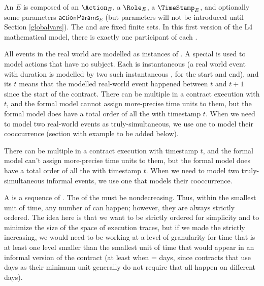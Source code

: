 \documentclass[12pt]{article}
\begin{document}
An  $E$ is composed of an  
\newcommand{\eaction}[1]{\Action_{#1}}
$\eaction{E}$, 
a  
\newcommand{\erole}[1]{\Role_{#1}}
$\erole{E}$, 
a \TimeStamp 
\newcommand{\etimestamp}[1]{\TimeStamp_{#1}}
$\etimestamp{E}$, 
and optionally some parameters 
\newcommand{\eactionparams}[1]{\textsf{actionParams}_{#1}} 
$\eactionparams{E}$ (but parameters will not be introduced until Section \ref{globalvars}). 
The \Actions and \Roles are fixed finite sets. In this first version of the L4 mathematical model, there is exactly one participant of each \Role.

All events in the real world are modelled as instances of \Actions. A special \Role {} is used to model actions that have no subject. Each \Event is instantaneous (a real world event with duration is modelled by two such instantaneous \Events, for the start and end), and its \TimeStamp $t$ means that the modelled real-world event happened between $t$ and $t+1$ \TimeUnits since the start of the contract. There can be multiple \Events in a contract execution with \TimeStamp $t$, and the formal model cannot assign more-precise time units to them, but the formal model does have a total order of all the \Events with timestamp $t$. When we need to model two real-world events as truly-simultaneous, we use one \Event to model their cooccurrence (section with example to be added below). 

There can be multiple \Events in a contract execution with timestamp $t$, and the formal model can't assign more-precise time units to them, but the formal model does have a total order of all the \Events with timestamp $t$. When we need to model two truly-simultaneous informal events, we use one \Event that models their cooccurrence.

A  is a sequence of \Events. The \TimeStamps of the \Events must be nondecreasing. Thus, within the smallest unit of time, any number of \Events can happen; however, they are always strictly ordered. The idea here is that we want \Events to be strictly ordered for simplicity and to minimize the size of the space of execution traces, but if we made the \TimeStamps strictly increasing, we would need to be working at a level of granularity for time that is at least one level smaller than the smallest unit of time that would appear in an informal version of the contract (at least when \TimeUnit = days, since contracts that use days as their minimum unit generally do not require that all \Events happen on different days).
\end{document}
